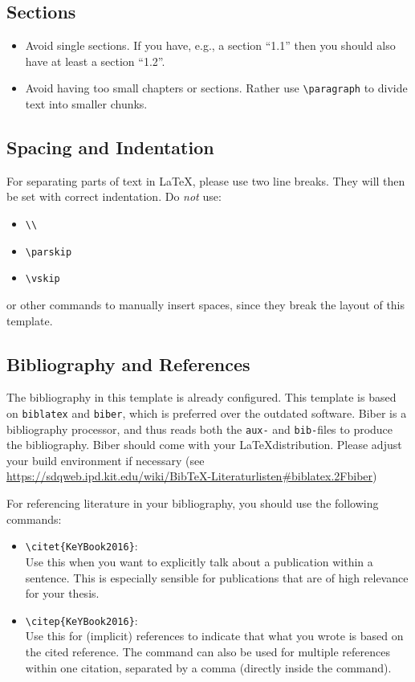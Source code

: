 \subsection{Sections}
\begin{itemize}
\item Avoid single sections. If you have, e.g., a section ``1.1'' then you should also
  have at least a section ``1.2''.
\item Avoid having too small chapters or sections. Rather use \verb+\paragraph+
  to divide text into smaller chunks.
\end{itemize}

\subsection{Spacing and Indentation}
For separating parts of text in \LaTeX, please use two line breaks. They will then
be set with correct indentation. Do \emph{not} use:
\begin{itemize}
  \itemsep0em
\item \texttt{\textbackslash\textbackslash}
\item \texttt{\textbackslash parskip}
\item \texttt{\textbackslash vskip}
\end{itemize}
or other commands to manually insert spaces, since they break the layout of this template.

\subsection{Bibliography and References}

The bibliography in this template is already configured. This template is based
on \texttt{biblatex} and \texttt{biber}, which is preferred over the outdated
 software. Biber is a bibliography processor, and thus reads both
the \texttt{aux-} and \texttt{bib-}files to produce the bibliography. Biber should
come with your \LaTeX distribution. Please adjust your build environment if
necessary (see
\url{https://sdqweb.ipd.kit.edu/wiki/BibTeX-Literaturlisten#biblatex.2Fbiber})

For referencing literature in your bibliography, you should use the following
commands:
\begin{itemize}
\item \verb+\citet{KeYBook2016}+: \citet{KeYBook2016}\\[.5ex]%
Use this when you want to explicitly talk about a publication within a sentence.
This is especially sensible for publications that are of high relevance for your thesis.
\item \verb+\citep{KeYBook2016}+: \citep{KeYBook2016}\\[.5ex]%
Use this for (implicit) references to indicate that what you wrote is based on the cited reference.
The command can also be used for multiple references within one citation, separated by a comma (directly inside the command).
\end{itemize}

